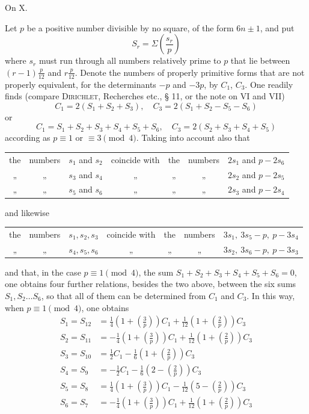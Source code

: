 \begin{center}\large On X.\end{center}

Let $p$ be a positive number divisible by no square, of the form $6n\pm1$, and put
\[
S_r=\Sigma\left(\frac{s_r}p\right)
\]
where $s_r$ must run through all numbers relatively prime to $p$ that lie between $(r-1)\frac p{12}$ and $r\frac p{12}$. Denote the numbers of properly primitive forms that are not properly equivalent, for the determinants $-p$ and $-3p$, by $C_1$, $C_3$. One readily finds (compare \textsc{Dirichlet}, Recherches etc., § 11, or the note on VI and VII)
\[
C_1=2(S_1+S_2+S_3),\quad C_3=2(S_1+S_2-S_5-S_6)
\]
or
\[
C_1=S_1+S_2+S_3+S_4+S_5+S_6,\quad C_3=2(S_2+S_3+S_4+S_5)
\]
according as $p\equiv1$ or $\equiv3\pmod4$. Taking into account also that
\begin{center}\small
\begin{tabular}{@{}ccccccl@{}}
the&numbers&$s_1$ and $s_2$&coincide with&the&numbers&$2s_1$ and $p-2s_6$\\
„&„&$s_3$ and $s_4$&„&„&„&$2s_2$ and $p-2s_5$\\
„&„&$s_5$ and $s_6$&„&„&„&$2s_3$ and $p-2s_4$
\end{tabular}
\end{center}
and likewise
\begin{center}\small
\begin{tabular}{@{}ccccccl@{}}
the&numbers&$s_1,s_2,s_3$&coincide with&the&numbers&$3s_1,\ 3s_5-p,\ p-3s_4$\\
„&„&$s_4,s_5,s_6$&„&„&„&$3s_2,\ 3s_6-p,\ p-3s_3$
\end{tabular}
\end{center}
and that, in the case $p\equiv1\pmod4$, the sum $S_1+S_2+S_3+S_4+S_5+S_6=0$, one obtains four further relations, besides the two above, between the six sums $S_1,S_2\ldots S_6$, so that all of them can be determined from $C_1$ and $C_3$. In this way, when $p\equiv1\pmod4$, one obtains
\[
\begin{aligned}
S_1=S_{12}&=\tfrac14\left(1+\left(\frac3p\right)\right)C_1+\tfrac1{12}\left(1+\left(\frac2p\right)\right)C_3\\
S_2=S_{11}&=-\tfrac14\left(1+\left(\frac3p\right)\right)C_1+\tfrac1{12}\left(1+\left(\frac2p\right)\right)C_3\\
S_3=S_{10}&=\tfrac12C_1-\tfrac16\left(1+\left(\frac2p\right)\right)C_3\\
S_4=S_9&=-\tfrac12C_1-\tfrac16\left(2-\left(\frac2p\right)\right)C_3\\
S_5=S_8&=\tfrac14\left(1+\left(\frac3p\right)\right)C_1-\tfrac1{12}\left(5-\left(\frac2p\right)\right)C_3\\
S_6=S_7&=-\tfrac14\left(1+\left(\frac3p\right)\right)C_1+\tfrac1{12}\left(1+\left(\frac2p\right)\right)C_3
\end{aligned}
\]
